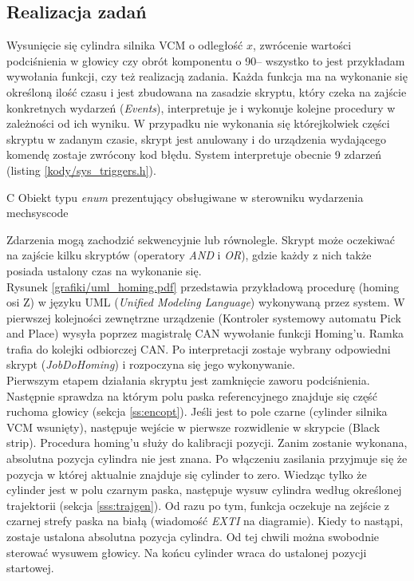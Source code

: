 \subsection{Realizacja zadań}

Wysunięcie się cylindra silnika VCM o odległość $ x $, zwrócenie wartości podciśnienia w głowicy czy obrót komponentu o 90\degree -- wszystko to jest przykładam wywołania funkcji, czy też realizacją zadania. Każda funkcja ma na wykonanie się określoną ilość czasu i jest zbudowana na zasadzie skryptu, który czeka na zajście konkretnych wydarzeń ({\it Events}), interpretuje je i wykonuje kolejne procedury w zależności od ich wyniku. W przypadku nie wykonania się którejkolwiek części skryptu w zadanym czasie, skrypt jest anulowany i do urządzenia wydającego komendę zostaje zwrócony kod błędu. System interpretuje obecnie 9 zdarzeń (listing \ref{kody/sys_triggers.h}).

		   {C}
		   {Obiekt typu {\it enum} prezentujący obsługiwane w sterowniku wydarzenia}
		   {mechsyscode}

Zdarzenia mogą zachodzić sekwencyjnie lub równolegle. Skrypt może oczekiwać na zajście kilku skryptów (operatory {\it AND} i {\it OR}), gdzie każdy z nich także posiada ustalony czas na wykonanie się. \\

Rysunek \ref{grafiki/uml_homing.pdf} przedstawia przykładową procedurę (homing osi Z) w języku UML ({\it Unified Modeling Language}) wykonywaną przez system. W pierwszej kolejności zewnętrzne urządzenie (Kontroler systemowy automatu Pick and Place) wysyła poprzez magistralę CAN wywołanie funkcji Homing'u. Ramka trafia do kolejki odbiorczej CAN. Po interpretacji zostaje wybrany odpowiedni skrypt ({\it JobDoHoming}) i rozpoczyna się jego wykonywanie. \\

Pierwszym etapem działania skryptu jest zamknięcie zaworu podciśnienia. Następnie sprawdza na którym polu paska referencyjnego znajduje się część ruchoma głowicy (sekcja \ref{ss:encopt}). Jeśli jest to pole czarne (cylinder silnika VCM wsunięty), następuje wejście w pierwsze rozwidlenie w skrypcie (Black strip). Procedura homing'u służy do kalibracji pozycji. Zanim zostanie wykonana, absolutna pozycja cylindra nie jest znana. Po włączeniu zasilania przyjmuje się że pozycja w której aktualnie znajduje się cylinder to zero. Wiedząc tylko że cylinder jest w polu czarnym paska, następuje wysuw cylindra według określonej trajektorii (sekcja \ref{sss:trajgen}). Od razu po tym, funkcja oczekuje na zejście z czarnej strefy paska na białą (wiadomość {\it EXTI} na diagramie). Kiedy to nastąpi, zostaje ustalona absolutna pozycja cylindra. Od tej chwili można swobodnie sterować wysuwem głowicy. Na końcu cylinder wraca do ustalonej pozycji startowej.

